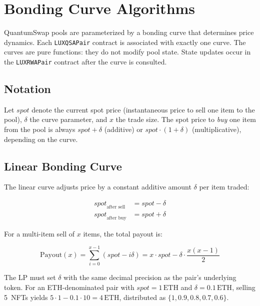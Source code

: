 \section{Bonding Curve Algorithms}


QuantumSwap pools are parameterized by a bonding curve that determines
price dynamics. Each \texttt{LUXQSAPair} contract is associated with
exactly one curve. The curves are pure functions: they do not modify
pool state. State updates occur in the \texttt{LUXRWAPair} contract
after the curve is consulted.

\subsection{Notation}

Let $\mathit{spot}$ denote the current spot price (instantaneous price
to sell one item to the pool), $\delta$ the curve parameter, and $x$
the trade size. The spot price to \emph{buy} one item from the pool is
always $\mathit{spot} + \delta$ (additive) or $\mathit{spot} \cdot
(1 + \delta)$ (multiplicative), depending on the curve.

\subsection{Linear Bonding Curve}

The linear curve adjusts price by a constant additive amount $\delta$
per item traded:

\begin{align}
\mathit{spot}_{\text{after sell}} &= \mathit{spot} - \delta
  \label{eq:linear-sell} \\
\mathit{spot}_{\text{after buy}} &= \mathit{spot} + \delta
  \label{eq:linear-buy}
\end{align}

For a multi-item sell of $x$ items, the total payout is:

\begin{equation}\label{eq:linear-multi}
\text{Payout}(x) = \sum_{i=0}^{x-1} (\mathit{spot} - i\delta)
= x \cdot \mathit{spot} - \delta \cdot \frac{x(x-1)}{2}
\end{equation}

\begin{remark}
The LP must set $\delta$ with the same decimal precision as the
pair's underlying token. For an ETH-denominated pair with
$\mathit{spot} = 1\,\text{ETH}$ and $\delta = 0.1\,\text{ETH}$,
selling 5~NFTs yields
$5 \cdot 1 - 0.1 \cdot 10 = 4\,\text{ETH}$, distributed as
$\{1, 0.9, 0.8, 0.7, 0.6\}$.
\end{remark}


